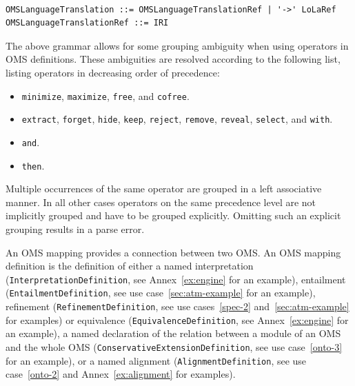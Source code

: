 \documentclass[10pt, a4paper]{isov2}
\newcommand*{\termref}[1]{\index{#1}#1\xspace}
\newcommand*{\syntax}[1]{\texttt{#1}}
\begin{document}
\begin{lstlisting}[language=ebnf,mathescape]

OMSLanguageTranslation ::= OMSLanguageTranslationRef | '->' LoLaRef
OMSLanguageTranslationRef ::= IRI
\end{lstlisting}


The above grammar allows for some grouping ambiguity when using operators in
OMS definitions. These ambiguities are resolved according to the following
list, listing operators in decreasing order of precedence:
 \begin{itemize} 
  \item \syntax{minimize}, \syntax{maximize}, \syntax{free}, and \syntax{cofree}. 
  \item \syntax{extract}, \syntax{forget}, \syntax{hide}, \syntax{keep},
    \syntax{reject}, \syntax{remove}, \syntax{reveal}, \syntax{select}, and
    \syntax{with}.
  \item \syntax{and}.
  \item \syntax{then}.
 \end{itemize} 
Multiple occurrences of the same operator are grouped in a left associative
manner. In all other cases operators on the same precedence level are not
implicitly grouped and have to be grouped explicitly. Omitting such an explicit
grouping results in a parse error.


\label{c:oms-mappings}




An OMS mapping provides a connection between two OMS. An OMS mapping
definition is the definition of either a named interpretation
(\syntax{InterpretationDefinition}, see Annex~\ref{ex:engine} for an example), entailment (\syntax{EntailmentDefinition}, see use case~\ref{sec:atm-example} for an example),
refinement (\syntax{RefinementDefinition}, see use cases~\ref{spec-2} and~\ref{sec:atm-example} for examples) or equivalence
(\syntax{EquivalenceDefinition}, see Annex~\ref{ex:engine} for an example), a named declaration of the relation
between a module of an OMS and the whole OMS
(\syntax{ConservativeExtensionDefinition}, see use case~\ref{onto-3} for an example), or a named \termref{alignment}
(\syntax{AlignmentDefinition}, see use case~\ref{onto-2} and Annex~\ref{ex:alignment} for examples).
\end{document}
